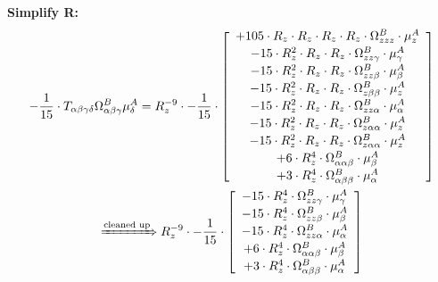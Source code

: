 \documentclass{article}
\begin{document}
\textbf{Simplify R:}
\begin{subequations}\begin{gather}
- \frac{1}{15} \cdot T_{\alpha{}\beta{}\gamma{}\delta{}} \Omega{}^{B}_{\alpha{}\beta{}\gamma{}} \mu{}^{A}_{\delta{}} = R_{z}^{-9} \cdot - \frac{1}{15} \cdot  \left[ \begin{array}{c} 
 		+ 105 \cdot R_{z} \cdot R_{z} \cdot R_{z} \cdot R_{z} \cdot \Omega{}^{B}_{zzz} \cdot \mu{}^{A}_{z} 
 \\[0.2em] 		 - 15 \cdot R_{z}^{2} \cdot R_{z} \cdot R_{z} \cdot \Omega{}^{B}_{zz\gamma{}} \cdot \mu{}^{A}_{\gamma{}} 
 \\[0.2em] 		 - 15 \cdot R_{z}^{2} \cdot R_{z} \cdot R_{z} \cdot \Omega{}^{B}_{zz\beta{}} \cdot \mu{}^{A}_{\beta{}} 
 \\[0.2em] 		 - 15 \cdot R_{z}^{2} \cdot R_{z} \cdot R_{z} \cdot \Omega{}^{B}_{z\beta{}\beta{}} \cdot \mu{}^{A}_{z} 
 \\[0.2em] 		 - 15 \cdot R_{z}^{2} \cdot R_{z} \cdot R_{z} \cdot \Omega{}^{B}_{zz\alpha{}} \cdot \mu{}^{A}_{\alpha{}} 
 \\[0.2em] 		 - 15 \cdot R_{z}^{2} \cdot R_{z} \cdot R_{z} \cdot \Omega{}^{B}_{z\alpha{}\alpha{}} \cdot \mu{}^{A}_{z} 
 \\[0.2em] 		 - 15 \cdot R_{z}^{2} \cdot R_{z} \cdot R_{z} \cdot \Omega{}^{B}_{z\alpha{}\alpha{}} \cdot \mu{}^{A}_{z} 
 \\[0.2em] 		 + 6 \cdot R_{z}^{4} \cdot \Omega{}^{B}_{\alpha{}\alpha{}\beta{}} \cdot \mu{}^{A}_{\beta{}} 
 \\[0.2em] 		 + 3 \cdot R_{z}^{4} \cdot \Omega{}^{B}_{\alpha{}\beta{}\beta{}} \cdot \mu{}^{A}_{\alpha{}}
 \end{array}\right] 
\\ \xRightarrow{\text{cleaned up}}
 R_{z}^{-9} \cdot - \frac{1}{15} \cdot  \left[ \begin{array}{c} 
 		- 15 \cdot R_{z}^{4} \cdot \Omega{}^{B}_{zz\gamma{}} \cdot \mu{}^{A}_{\gamma{}} 
 \\[0.2em] 		 - 15 \cdot R_{z}^{4} \cdot \Omega{}^{B}_{zz\beta{}} \cdot \mu{}^{A}_{\beta{}} 
 \\[0.2em] 		 - 15 \cdot R_{z}^{4} \cdot \Omega{}^{B}_{zz\alpha{}} \cdot \mu{}^{A}_{\alpha{}} 
 \\[0.2em] 		 + 6 \cdot R_{z}^{4} \cdot \Omega{}^{B}_{\alpha{}\alpha{}\beta{}} \cdot \mu{}^{A}_{\beta{}} 
 \\[0.2em] 		 + 3 \cdot R_{z}^{4} \cdot \Omega{}^{B}_{\alpha{}\beta{}\beta{}} \cdot \mu{}^{A}_{\alpha{}}
 \end{array}\right] 

\end{gather}
\end{subequations}
\end{document}
